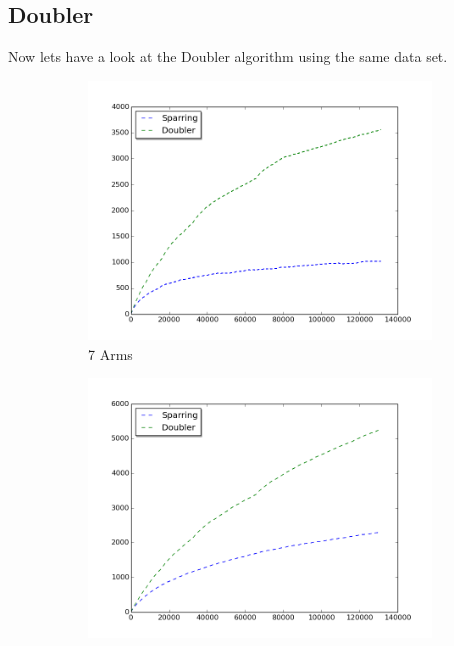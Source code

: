 \documentclass{llncs}
\begin{document}
\newpage
\subsection{Doubler}
Now lets have a look at the Doubler algorithm using the same data set.
\begin{figure}[h!]
\centering
\begin{subfigure}{.5\textwidth}
  \centering
  \includegraphics[scale=0.3]{figures/doubler_sparring_MQ2007_7arms.png}
  \caption{7 Arms}
  \label{fig:sub1}
\end{subfigure}%
\begin{subfigure}{.5\textwidth}
  \centering
  \includegraphics[scale=0.3]{figures/doubler_sparring_MQ2007_16arms.png}

\end{subfigure}
\end{figure}
\end{document}
